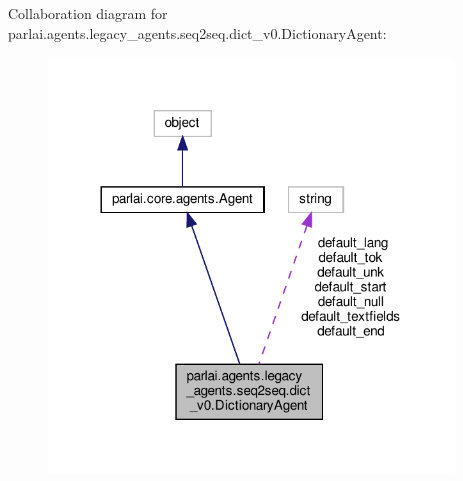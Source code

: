 Collaboration diagram for parlai.\+agents.\+legacy\+\_\+agents.\+seq2seq.\+dict\+\_\+v0.\+Dictionary\+Agent\+:
\nopagebreak
\begin{figure}[H]
\begin{center}
\leavevmode
\includegraphics[width=305pt]{classparlai_1_1agents_1_1legacy__agents_1_1seq2seq_1_1dict__v0_1_1DictionaryAgent__coll__graph}
\end{center}
\end{figure}
